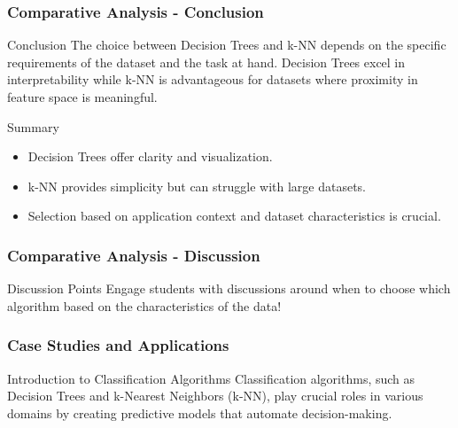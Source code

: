 \documentclass[aspectratio=169]{beamer}
\begin{document}
\begin{frame}[fragile]
    \frametitle{Comparative Analysis - Conclusion}
    \begin{block}{Conclusion}
        The choice between Decision Trees and k-NN depends on the specific requirements of the dataset 
        and the task at hand. Decision Trees excel in interpretability while k-NN is advantageous for 
        datasets where proximity in feature space is meaningful.
    \end{block}
    
    \begin{block}{Summary}
        \begin{itemize}
            \item Decision Trees offer clarity and visualization.
            \item k-NN provides simplicity but can struggle with large datasets.
            \item Selection based on application context and dataset characteristics is crucial.
        \end{itemize}
    \end{block}
\end{frame}

\begin{frame}[fragile]
    \frametitle{Comparative Analysis - Discussion}
    \begin{block}{Discussion Points}
        Engage students with discussions around when to choose which algorithm based on the 
        characteristics of the data!
    \end{block}
\end{frame}

\begin{frame}
    \frametitle{Case Studies and Applications}
    \begin{block}{Introduction to Classification Algorithms}
        Classification algorithms, such as Decision Trees and k-Nearest Neighbors (k-NN), play crucial roles in various domains by creating predictive models that automate decision-making.
    \end{block}
\end{frame}
\end{document}
